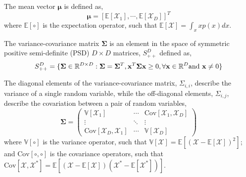 The mean vector $\boldsymbol{\mu}$ is defined as,
\begin{equation}
	\boldsymbol{\mu} = [\mathbb{E}[\mathcal{X}_1], \cdots, \mathbb{E}[\mathcal{X}_D]]^T
\label{eq:mean_vector}
\end{equation}
where $\mathbb{E}[\circ]$ is the expectation operator, such that $\mathbb{E}[\mathcal{X}] = \int_x x p(x) dx$.

The variance-covariance matrix $\boldsymbol{\Sigma}$ is an element in the space of symmetric positive semi-definite (PSD) $D \times D$ matrices, $S_{++}^D$ defined as,
\begin{equation}
	S_{++}^D = \{\boldsymbol{\Sigma} \in \mathbb{R}^{D\times D}: \boldsymbol{\Sigma} = \boldsymbol{\Sigma}^T, \mathbf{x}^T \boldsymbol{\Sigma} \mathbf{x} \geq 0, \forall \mathbf{x} \in \mathbb{R}^D \textnormal{and } \mathbf{x} \neq 0 \}
	\label{eq:def_covariance_matrix}
\end{equation}

The diagonal elements of the variance-covariance matrix, $\Sigma_{i,i}$, describe the variance of a single random variable,
while the off-diagonal elements, $\Sigma_{i,j}$, describe the covariation between a pair of random variables,
\begin{equation}
	\boldsymbol{\Sigma} =
	\begin{pmatrix}
			\mathbb{V}[\mathcal{X}_1] 							 & \cdots		& \text{Cov}[\mathcal{X}_1, \mathcal{X}_D] \\
			\vdots                   								 & \ddots   & \vdots \\
			\text{Cov}[\mathcal{X}_D, \mathcal{X}_1] & \cdots 	& \mathbb{V}[\mathcal{X}_D]
	\end{pmatrix}
\label{eq:covariance_matrix}
\end{equation}
where $\mathbb{V} [\circ]$ is the variance operator, such that $\mathbb{V} [\mathcal{X}] = \mathbb{E}[(\mathcal{X} - \mathbb{E}[\mathcal{X}])^2]$;
and $\text{Cov} [\circ, \circ]$ is the covariance operators, such that $\text{Cov} [\mathcal{X}, \mathcal{X}^*] = \mathbb{E}[(\mathcal{X}-\mathbb{E}[\mathcal{X}])(\mathcal{X}^*-\mathbb{E}[\mathcal{X}^*])]$.

